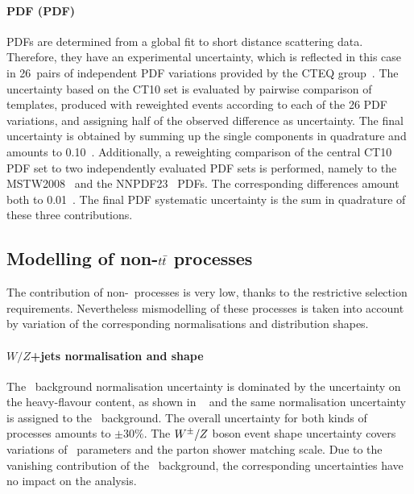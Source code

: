 \paragraph{\acrlong{PDF} (\acrshort{PDF})}\mbox{}
%
\glspl{PDF} are determined from a global fit to short distance scattering data. Therefore, they have an experimental uncertainty, which is reflected in this case in 26~pairs of independent \gls{PDF} variations provided by the CTEQ group~\cite{Pumplin2002}.
%
The uncertainty based on the CT10 set is evaluated by pairwise comparison of templates, produced with reweighted events according to each of the 26 \gls{PDF} variations, and assigning half of the observed difference as uncertainty. 
%
The final uncertainty is obtained by summing up the single components in quadrature and amounts to 0.10~\GeV.
%
Additionally, a reweighting comparison of the central CT10 \gls{PDF} set to two independently evaluated \gls{PDF} sets is performed, namely to the MSTW2008~\cite{MAR-0901} and the NNPDF23~\cite{Ball:2012cx} \glspl{PDF}. 
%
The corresponding differences amount both to 0.01~\GeV.
%
The final \gls{PDF} systematic uncertainty is the sum in quadrature of these three contributions.
%







\subsection[Modelling of non-\texorpdfstring{$\ttbar$}{ttbar} processes]{Modelling of non-\texorpdfstring{\boldmath$\ttbar$}{ttbar} processes}
%
The contribution of non-\ttbar\ processes is very low, thanks to the restrictive selection requirements. 
%
Nevertheless mismodelling of these processes is taken into account by variation of the corresponding normalisations and distribution shapes.
%
%
\paragraph{$W/Z$+jets normalisation and shape} 
%
The \Wj\ background normalisation uncertainty is dominated by the uncertainty on the heavy-flavour content, as shown in ~\cite{CERN-PH-EP-2012-015} and the same normalisation uncertainty is assigned to the \Zj\ background.
%
The overall uncertainty for both kinds of processes amounts to $\pm30\%$.
%
The $W^{\pm}/Z$ boson event shape uncertainty covers variations of \Alpgen\ parameters and the parton shower matching scale.
%
Due to the vanishing contribution of the \Wj\ background, the corresponding uncertainties have no impact on the analysis. 
%
%
